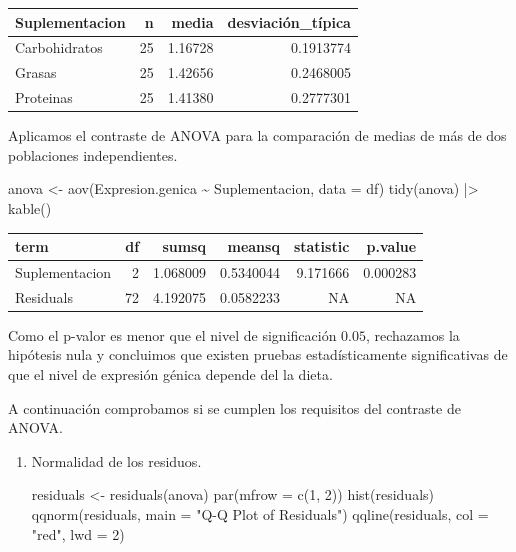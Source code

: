 \documentclass[
  spanish,
  a4paper,
]{scrreport}
\newenvironment{Shaded}{\begin{snugshade}}{\end{snugshade}}
\newcommand{\AttributeTok}[1]{\textcolor[rgb]{0.40,0.45,0.13}{#1}}
\newcommand{\DecValTok}[1]{\textcolor[rgb]{0.68,0.00,0.00}{#1}}
\newcommand{\FunctionTok}[1]{\textcolor[rgb]{0.28,0.35,0.67}{#1}}
\newcommand{\NormalTok}[1]{\textcolor[rgb]{0.00,0.23,0.31}{#1}}
\newcommand{\OtherTok}[1]{\textcolor[rgb]{0.00,0.23,0.31}{#1}}
\newcommand{\SpecialCharTok}[1]{\textcolor[rgb]{0.37,0.37,0.37}{#1}}
\newcommand{\StringTok}[1]{\textcolor[rgb]{0.13,0.47,0.30}{#1}}
\newcounter{none} %
\theoremstyle{definition}
\theoremstyle{remark}
\begin{document}
\begin{tcolorbox}
{\def\LTcaptype{none} %
\begin{longtable}[]{@{}lrrr@{}}
\toprule\noalign{}
Suplementacion & n & media & desviación\_típica \\
\midrule\noalign{}
\endhead
\bottomrule\noalign{}
\endlastfoot
Carbohidratos & 25 & 1.16728 & 0.1913774 \\
Grasas & 25 & 1.42656 & 0.2468005 \\
Proteinas & 25 & 1.41380 & 0.2777301 \\
\end{longtable}
}

Aplicamos el contraste de ANOVA para la comparación de medias de más de
dos poblaciones independientes.

\begin{Shaded}
\begin{Highlighting}[]
\NormalTok{anova }\OtherTok{\textless{}{-}} \FunctionTok{aov}\NormalTok{(Expresion.genica }\SpecialCharTok{\textasciitilde{}}\NormalTok{ Suplementacion, }\AttributeTok{data =}\NormalTok{ df)}
\FunctionTok{tidy}\NormalTok{(anova) }\SpecialCharTok{|\textgreater{}} 
    \FunctionTok{kable}\NormalTok{()}
\end{Highlighting}
\end{Shaded}

{\def\LTcaptype{none} %
\begin{longtable}[]{@{}lrrrrr@{}}
\toprule\noalign{}
term & df & sumsq & meansq & statistic & p.value \\
\midrule\noalign{}
\endhead
\bottomrule\noalign{}
\endlastfoot
Suplementacion & 2 & 1.068009 & 0.5340044 & 9.171666 & 0.000283 \\
Residuals & 72 & 4.192075 & 0.0582233 & NA & NA \\
\end{longtable}
}

Como el p-valor es menor que el nivel de significación \(0.05\),
rechazamos la hipótesis nula y concluimos que existen pruebas
estadísticamente significativas de que el nivel de expresión génica
depende del la dieta.

A continuación comprobamos si se cumplen los requisitos del contraste de
ANOVA.

\begin{enumerate}
\def\labelenumi{\alph{enumi}.}
\item
  Normalidad de los residuos.

\begin{Shaded}
\begin{Highlighting}[]
\NormalTok{residuals }\OtherTok{\textless{}{-}} \FunctionTok{residuals}\NormalTok{(anova)}
\FunctionTok{par}\NormalTok{(}\AttributeTok{mfrow =} \FunctionTok{c}\NormalTok{(}\DecValTok{1}\NormalTok{, }\DecValTok{2}\NormalTok{))  }
\FunctionTok{hist}\NormalTok{(residuals)}
\FunctionTok{qqnorm}\NormalTok{(residuals, }\AttributeTok{main =} \StringTok{"Q{-}Q Plot of Residuals"}\NormalTok{)}
\FunctionTok{qqline}\NormalTok{(residuals, }\AttributeTok{col =} \StringTok{"red"}\NormalTok{, }\AttributeTok{lwd =} \DecValTok{2}\NormalTok{)}
\end{Highlighting}
\end{Shaded}


\end{enumerate}
\end{tcolorbox}
\end{document}

